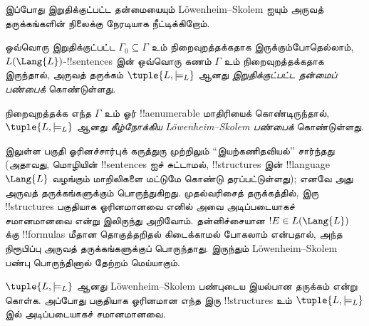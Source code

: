 \documentclass[../../../include/open-logic-section]{subfiles}
\begin{document}



இப்போது இறுதிக்குட்பட்ட தன்மையையும் L\"owenheim--Skolem ஐயும்
அருவத் தருக்கங்களின் நிலைக்கு நேரடியாக நீட்டிக்கிறோம்.

\begin{defn}
ஒவ்வொரு இறுதிக்குட்பட்ட $\Gamma_0 \subseteq \Gamma$ உம்
நிறைவுறத்தக்கதாக இருக்கும்போதெல்லாம், $L(\Lang{L})$-!!{sentence}s
இன் ஒவ்வொரு கணம் $\Gamma$ உம் நிறைவுறத்தக்கதாக இருந்தால்,
அருவத் தருக்கம் $\tuple{L, \models_L}$ ஆனது
\emph{இறுதிக்குட்பட்ட தன்மைப் பண்பைக்} கொண்டுள்ளது.
\end{defn}

\begin{defn}
நிறைவுறத்தக்க எந்த $\Gamma$ உம் ஓர் !!a{enumerable} மாதிரியைக்
கொண்டிருந்தால், $\tuple{L, \models_L}$ ஆனது
\emph{கீழ்நோக்கிய L\"owenheim--Skolem பண்பைக்} கொண்டுள்ளது.
\end{defn}


 இலுள்ள பகுதி ஓரினச்சார்புக் கருத்துரு
முற்றிலும் ``இயற்கணிதவியல்'' சார்ந்தது (அதாவது, மொழியின்
!!{sentence}s ஐச் சுட்டாமல், !!{structure}s இன்
!!{language}~$\Lang{L}$ வழங்கும் மாறிலிகளை மட்டுமே கொண்டு
தரப்பட்டுள்ளது); எனவே அது அருவத் தருக்கங்களுக்கும் பொருந்துகிறது.
முதல்வரிசைத் தருக்கத்தில், இரு !!{structure}s பகுதியாக ஓரினமானவை
எனில் அவை அடிப்படையாகச் சமானமானவை என்று
 இலிருந்து அறிவோம். தன்னிச்சையான
$!E \in L(\Lang{L})$ க்கு !!{formula}s மீதான தொகுத்தறிதல் கிடைக்காமல்
போகலாம் என்பதால், அந்த நிரூபிப்பு அருவத் தருக்கங்களுக்குப் பொருந்தாது.
இருந்தும் L\"owenheim--Skolem பண்பு பொருந்தினால் தேற்றம் மெய்யாகும்.

\begin{thm}
$\tuple{L, \models_L}$ ஆனது L\"owenheim--Skolem பண்புடைய இயல்பான
தருக்கம் என்று கொள்க. அப்போது பகுதியாக ஓரினமான எந்த இரு
!!{structure}s உம் $\tuple{L,
  \models_L}$ இல் அடிப்படையாகச் சமானமானவை.
\end{thm}
\end{document}
